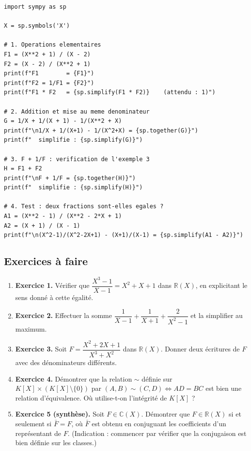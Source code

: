 \documentclass[12pt,a4paper]{report}
\theoremstyle{definition}
\theoremstyle{remark}
\begin{document}
\begin{lstlisting}
import sympy as sp

X = sp.symbols('X')

# 1. Operations elementaires
F1 = (X**2 + 1) / (X - 2)
F2 = (X - 2) / (X**2 + 1)
print(f"F1        = {F1}")
print(f"F2 = 1/F1 = {F2}")
print(f"F1 * F2   = {sp.simplify(F1 * F2)}    (attendu : 1)")

# 2. Addition et mise au meme denominateur
G = 1/X + 1/(X + 1) - 1/(X**2 + X)
print(f"\n1/X + 1/(X+1) - 1/(X^2+X) = {sp.together(G)}")
print(f"  simplifie : {sp.simplify(G)}")

# 3. F + 1/F : verification de l'exemple 3
H = F1 + F2
print(f"\nF + 1/F = {sp.together(H)}")
print(f"  simplifie : {sp.simplify(H)}")

# 4. Test : deux fractions sont-elles egales ?
A1 = (X**2 - 1) / (X**2 - 2*X + 1)
A2 = (X + 1) / (X - 1)
print(f"\n(X^2-1)/(X^2-2X+1) - (X+1)/(X-1) = {sp.simplify(A1 - A2)}")
\end{lstlisting}

\subsection{Exercices à faire}
\begin{enumerate}
    \item \textbf{Exercice 1.} Vérifier que $\dfrac{X^3 - 1}{X - 1} = X^2 + X + 1$ dans $\mathbb{R}(X)$, en explicitant le sens donné à cette égalité.
    \item \textbf{Exercice 2.} Effectuer la somme $\dfrac{1}{X - 1} + \dfrac{1}{X + 1} + \dfrac{2}{X^2 - 1}$ et la simplifier au maximum.
    \item \textbf{Exercice 3.} Soit $F = \dfrac{X^2 + 2X + 1}{X^3 + X^2}$ dans $\mathbb{R}(X)$. Donner deux écritures de $F$ avec des dénominateurs différents.
    \item \textbf{Exercice 4.} Démontrer que la relation $\sim$ définie sur $K[X] \times (K[X] \setminus \{0\})$ par $(A, B) \sim (C, D) \iff AD = BC$ est bien une relation d'équivalence. Où utilise-t-on l'intégrité de $K[X]$ ?
    \item \textbf{Exercice 5 (synthèse).} Soit $F \in \mathbb{C}(X)$. Démontrer que $F \in \mathbb{R}(X)$ si et seulement si $\bar{F} = F$, où $\bar{F}$ est obtenu en conjuguant les coefficients d'un représentant de $F$. (Indication : commencer par vérifier que la conjugaison est bien définie sur les classes.)
\end{enumerate}
\end{document}
